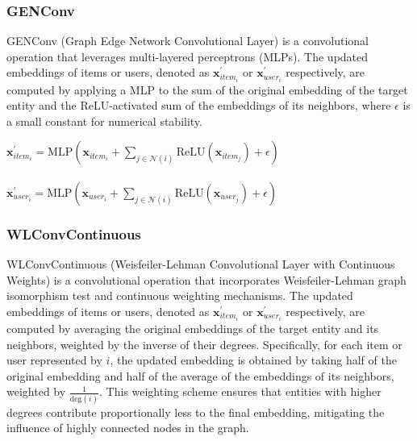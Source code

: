 \documentclass[bst/sn-nature]{sn-jnl}
\begin{document}
\begin{multicols}{2}
\subsubsection{GENConv\cite{genconv}} 

\quad GENConv (Graph Edge Network Convolutional Layer) is a convolutional operation that leverages multi-layered perceptrons (MLPs). The updated embeddings of items or users, denoted as $\mathbf{x}^{\prime}_{item_i}$ or $\mathbf{x}^{\prime}_{user_i}$ respectively, are computed by applying a MLP to the sum of the original embedding of the target entity and the ReLU-activated sum of the embeddings of its neighbors, where $\epsilon$ is a small constant for numerical stability. \\ 

\begin{center}
    $\mathbf{x}_{item_{i}}^{\prime} = \mathrm{MLP} \left( \mathbf{x}_{item_{i}} +
    \sum_{j \in \mathcal{N}(i)} 
    \mathrm{ReLU} \left( \mathbf{x}_{item_{j}} \right) +\epsilon \right)$ \\~\\
    $\mathbf{x}_{user_{i}}^{\prime} = \mathrm{MLP} \left( \mathbf{x}_{user_{i}} +
    \sum_{j \in \mathcal{N}(i)} 
    \mathrm{ReLU} \left( \mathbf{x}_{user_{j}} \right) +\epsilon \right)$ 
\end{center}

\subsubsection{WLConvContinuous\cite{wlconvcontinuous}} 

\quad WLConvContinuous (Weisfeiler-Lehman Convolutional Layer with Continuous Weights) is a convolutional operation that incorporates Weisfeiler-Lehman graph isomorphism test and continuous weighting mechanisms. The updated embeddings of items or users, denoted as $\mathbf{x}^{\prime}_{item_i}$ or $\mathbf{x}^{\prime}_{user_i}$ respectively, are computed by averaging the original embeddings of the target entity and its neighbors, weighted by the inverse of their degrees. Specifically, for each item or user represented by $i$, the updated embedding is obtained by taking half of the original embedding and half of the average of the embeddings of its neighbors, weighted by $\frac{1}{\text{deg}(i)}$. This weighting scheme ensures that entities with higher degrees contribute proportionally less to the final embedding, mitigating the influence of highly connected nodes in the graph. \\ 


\end{multicols}
\end{document}
